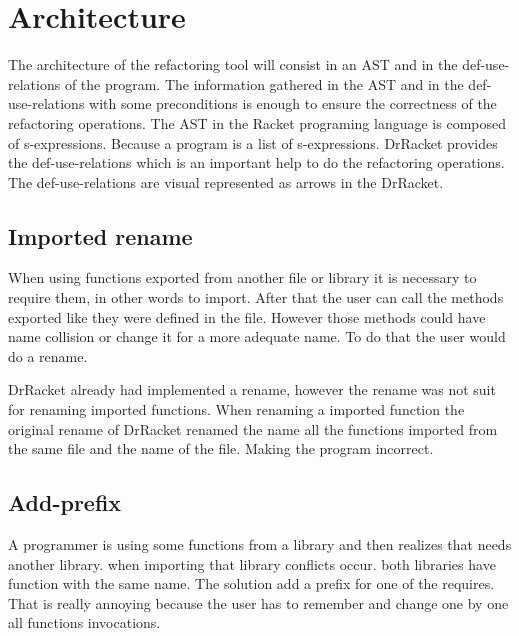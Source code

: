 
% 
% 

\section{Architecture}





The architecture of the refactoring tool will consist in an AST and in the def-use-relations of the program.
The information gathered in the AST and in the def-use-relations with some preconditions is enough to ensure the correctness of the refactoring operations.
The AST in the Racket programing language is composed of s-expressions. Because a program is a list of s-expressions.
DrRacket provides the def-use-relations which is an important help to do the refactoring operations. The def-use-relations are visual represented as arrows in the DrRacket.




\subsection{Imported rename}
When using functions exported from another file or library it is necessary to require them, in other words to import.
After that the user can call the methods exported like they were defined in the file.
However those methods could have name collision or change it for a more adequate name. To do that the user would do a rename.

DrRacket already had implemented a rename, however the rename was not suit for renaming imported functions.
When renaming a imported function the original rename of DrRacket renamed the name all the functions imported from the same file and the name of the file. 
Making the program incorrect.


\subsection{Add-prefix}
A programmer is using some functions from a library and then realizes that needs another library. when importing that library conflicts occur.
both libraries have function with the same name. The solution add a prefix for one of the requires.
That is really annoying because the user has to remember and change one by one all functions invocations.

